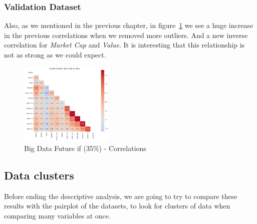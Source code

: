 \documentclass[11pt,english,a4paper,hidelinks]{book}
\begin{document}
\subsubsection{Validation Dataset}

\noindent Also, as we mentioned in the previous chapter, in figure~\ref{fig:medium_data_future_if_correlations} we see a huge increase in the previous correlations when we removed more outliers. And a new inverse correlation for \textit{Market Cap} and \textit{Value}. It is interesting that this relationship is not as strong as we could expect.

\begin{figure}[H]
    \centering
    \includegraphics[width=0.4\textwidth]{images/code/descriptive analysis/correlations/Medium future - IF HARD.png}
    \caption{Big Data Future \acrshort{if} (35\%) - Correlations}
    \label{fig:medium_data_future_if_correlations}
\end{figure}



\subsection{Data clusters}
Before ending the descriptive analysis, we are going to try to compare these results with the \acrshort{pairplot} of the datasets, to look for clusters of data when comparing many variables at once.
\end{document}
